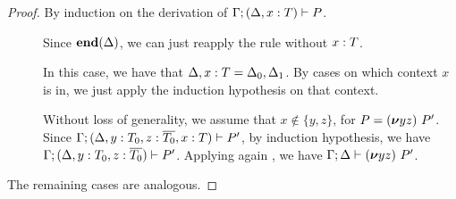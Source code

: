 \begin{proof}
  By induction on the derivation of
  $\Gamma; (\Delta, x : T) \vdash P$.
  \begin{description}
  \item[] Since $\mathbf{end}(\Delta)$, we can just reapply
    the rule without $x : T$.

  \item[] In this case, we have that
    $\Delta, x : T = \Delta_0, \Delta_1$.  By cases on which
    context $x$ is in, we just apply the induction hypothesis on
    that context.
  \item[] Without loss of generality, we assume that
    $x \notin \{y,z\}$, for $P=(\bm{\nu} yz)~P'$. Since
    $\Gamma;(\Delta, y : T_0, z : \overline{T_0}, x : T) \vdash P'$, by
    induction hypothesis, we have
    $\Gamma;(\Delta, y : T_0, z : \overline{T_0}) \vdash P'$. Applying
    again , we have
    $\Gamma;\Delta \vdash (\bm{\nu} yz)~P'$.
  \end{description}
  The remaining cases are analogous.
\end{proof}

